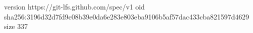 version https://git-lfs.github.com/spec/v1
oid sha256:3196d32d7fd9c08b39e0da6e283e803eba9106b5af57dac433cba821597d4629
size 337
